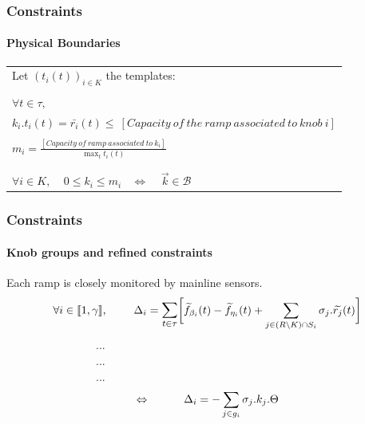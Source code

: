 \documentclass[fleqn]{beamer}
\begin{document}
\begin{frame}
	\frametitle{Constraints}
	\framesubtitle{Physical Boundaries}
	\begin{tabular}{l}
		Let $(t_{i}(t))_{i\in{K}}$ the templates:\\
		\\
		$\forall t \in \tau,$\\
		$k_{i}.t_{i}(t)=\bar{r_{i}}(t)\leq\ [Capacity\ of\ the\ ramp\ associated\ to\ knob\ i]$\\
		\\		
		$m_{i}=\frac{[Capacity\ of\ ramp\ associated\ to\ k_{i}]}{\max_{t} t_{i}(t)}$\\
		\\
		\\
		$\forall i\in{K},\ \ \ \ \ 0\leq k_{i}\leq m_{i} \ \ \ \ \Leftrightarrow \ \ \ \ \ \vec{k}\in\mathscr{B}$
	\end{tabular}
\end{frame}


\begin{frame}
	\frametitle{Constraints}
	\framesubtitle{Knob groups and refined constraints}
		Each ramp is closely monitored by mainline sensors.\\
		\begin{equation*}
					\forall i \in \llbracket 1,\gamma \rrbracket, \ \ \ \ \ \ \ \Delta_{i} =\mathlarger{\sum\limits_{t\in \tau}}\bigg[\widetilde{f}_{\beta_{i}}(t)-\widetilde{f}_{\eta_{i}}(t)+\sum\limits_{j\in (R\backslash K)\cap S_{i}}\sigma_{j}.\widetilde{r_{j}}(t)\bigg]
		\end{equation*}
		~~~~~~~~~~~~~~~~...\\
		~~~~~~~~~~~~~~~~...\\
		~~~~~~~~~~~~~~~~...\\
		\begin{equation*}
			\centering
			\Leftrightarrow  \ \ \ \ \ \ \ \ \ \Delta_{i}=-\sum\limits_{j\in g_{i}}\sigma_{j}.k_{j}.\Theta
		\end{equation*}
\end{frame}
\end{document}
